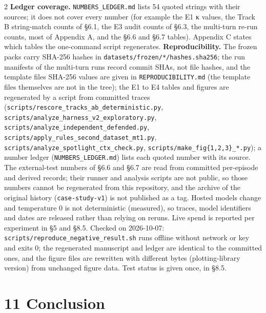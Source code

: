 \documentclass[9pt]{extarticle}
\begin{document}
\begin{multicols}{2}
\textbf{Ledger coverage.} \texttt{NUMBERS\_\allowbreak{}LEDGER.md} lists 54 quoted strings with their sources; it does not cover every number (for example the E1 κ values, the Track B string-match counts of §6.1, the E3 audit counts of §6.3, the multi-turn re-run counts, most of Appendix A, and the §6.6 and §6.7 tables). Appendix C states which tables the one-command script regenerates.
\textbf{Reproducibility.} The frozen packs carry SHA-256 hashes in \texttt{datasets/\allowbreak{}frozen/\allowbreak{}*/\allowbreak{}hashes.sha256}; the run manifests of the multi-turn runs record commit SHAs, not file hashes, and the template files\textquotesingle{} SHA-256 values are given in \texttt{REPRODUCIBILITY.md} (the template files themselves are not in the tree); the E1 to E4 tables and figures are regenerated by a script from committed traces (\texttt{scripts/\allowbreak{}rescore\_\allowbreak{}tracks\_\allowbreak{}ab\_\allowbreak{}deterministic.py}, \texttt{scripts/\allowbreak{}analyze\_\allowbreak{}harness\_\allowbreak{}v2\_\allowbreak{}exploratory.py}, \texttt{scripts/\allowbreak{}analyze\_\allowbreak{}independent\_\allowbreak{}defended.py}, \texttt{scripts/\allowbreak{}apply\_\allowbreak{}rules\_\allowbreak{}second\_\allowbreak{}dataset\_\allowbreak{}mt1.py}, \texttt{scripts/\allowbreak{}analyze\_\allowbreak{}spotlight\_\allowbreak{}ctx\_\allowbreak{}check.py}, \texttt{scripts/make\_fig\{1,2,3\}\_*.py}); a number ledger (\texttt{NUMBERS\_\allowbreak{}LEDGER.md}) lists each quoted number with its source. The external-test numbers of §6.6 and §6.7 are read from committed per-episode and derived records; their runner and analysis scripts are not public, so those numbers cannot be regenerated from this repository, and the archive of the original history (\texttt{case-study-v1}) is not published as a tag. Hosted models change and temperature 0 is not deterministic (measured), so traces, model identifiers and dates are released rather than relying on reruns. Live spend is reported per experiment in §5 and §8.5. Checked on 2026-10-07: \texttt{scripts/\allowbreak{}reproduce\_\allowbreak{}negative\_\allowbreak{}result.sh} runs offline without network or key and exits 0; the regenerated manuscript and ledger are identical to the committed ones, and the figure files are rewritten with different bytes (plotting-library version) from unchanged figure data. Test status is given once, in §8.5.

\section{11 Conclusion}


\end{multicols}
\end{document}
